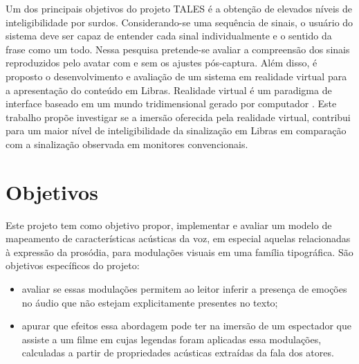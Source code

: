 \documentclass[a4paper,11pt,titlepage,singlespacing]{article}
\begin{document}
Um dos principais objetivos do projeto TALES é a obtenção de elevados níveis de inteligibilidade por surdos. Considerando-se uma sequência de sinais, o usuário do sistema deve ser capaz de entender cada sinal individualmente e o sentido da frase como um todo. Nessa pesquisa pretende-se avaliar a compreensão dos sinais reproduzidos pelo avatar com e sem os ajustes pós-captura. Além disso, é proposto o desenvolvimento e avaliação de um sistema em realidade virtual para a apresentação do conteúdo em Libras. Realidade virtual é um paradigma de interface baseado em um mundo tridimensional gerado por computador \cite{bryson_virtual_1996}. 
Este trabalho propõe investigar se a imersão oferecida pela realidade virtual, contribui para um maior nível de inteligibilidade da sinalização em Libras em comparação com a sinalização observada em monitores convencionais.



\section{Objetivos}

\noindent Este projeto tem como objetivo propor, implementar e avaliar um modelo de mapeamento de características acústicas da voz, em especial aquelas relacionadas à expressão da prosódia, para modulações visuais em uma família tipográfica. 
São objetivos específicos do projeto:
\begin{itemize}
    \item avaliar se essas modulações permitem ao leitor inferir a presença de emoções no áudio que não estejam explicitamente presentes no texto;
    \item apurar que efeitos essa abordagem pode ter na imersão de um espectador que assiste a um filme em cujas legendas foram aplicadas essa modulações, calculadas a partir de propriedades acústicas extraídas da fala dos atores.
\end{itemize} 




\end{document}
